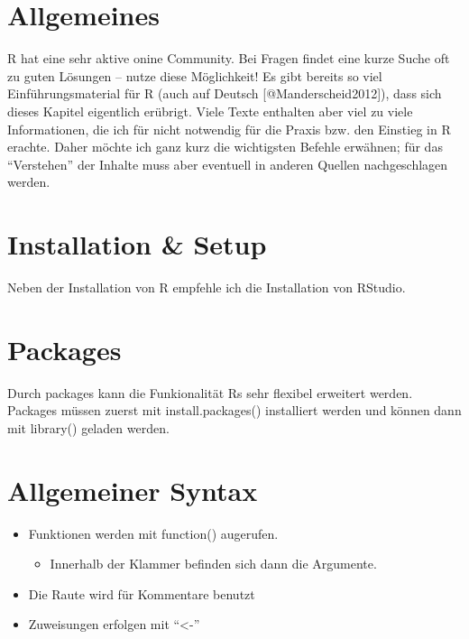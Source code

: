 \documentclass[
]{book}
\providecommand{\tightlist}{%
  \setlength{\itemsep}{0pt}\setlength{\parskip}{0pt}}
\begin{document}
\hypertarget{allgemeines-11}{%
\section{Allgemeines}\label{allgemeines-11}}

R hat eine sehr aktive onine Community. Bei Fragen findet eine kurze Suche oft zu guten Lösungen -- nutze diese Möglichkeit! Es gibt bereits so viel Einführungsmaterial für R (auch auf Deutsch {[}@Manderscheid2012{]}), dass sich dieses Kapitel eigentlich erübrigt. Viele Texte enthalten aber viel zu viele Informationen, die ich für nicht notwendig für die Praxis bzw. den Einstieg in R erachte. Daher möchte ich ganz kurz die wichtigsten Befehle erwähnen; für das ``Verstehen'' der Inhalte muss aber eventuell in anderen Quellen nachgeschlagen werden.

\hypertarget{installation-setup}{%
\section{Installation \& Setup}\label{installation-setup}}

Neben der Installation von R empfehle ich die Installation von RStudio.

\hypertarget{packages}{%
\section{Packages}\label{packages}}

Durch packages kann die Funkionalität Rs sehr flexibel erweitert werden. Packages müssen zuerst mit install.packages() installiert werden und können dann mit library() geladen werden.

\hypertarget{allgemeiner-syntax}{%
\section{Allgemeiner Syntax}\label{allgemeiner-syntax}}

\begin{itemize}
\tightlist
\item
  Funktionen werden mit function() augerufen.

  \begin{itemize}
  \tightlist
  \item
    Innerhalb der Klammer befinden sich dann die Argumente.
  \end{itemize}
\item
  Die Raute wird für Kommentare benutzt
\item
  Zuweisungen erfolgen mit ``\textless-''
\end{itemize}
\end{document}
